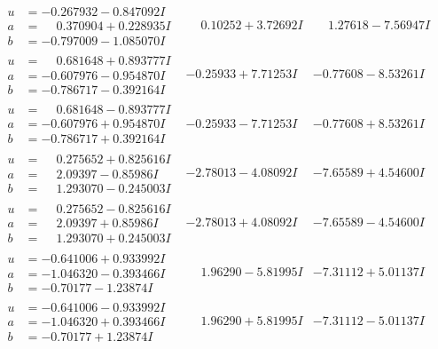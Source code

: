 \documentclass[1p]{elsarticle_modified}
\theoremstyle{definition}
\begin{document}
$$\begin{array}{c|c|c}
\begin{aligned}
u &= -0.267932 - 0.847092 I \\
a &= \phantom{-}0.370904 + 0.228935 I \\
b &= -0.797009 - 1.085070 I\end{aligned}
 & \phantom{-}0.10252 + 3.72692 I & \phantom{-}1.27618 - 7.56947 I \\ \hline\begin{aligned}
u &= \phantom{-}0.681648 + 0.893777 I \\
a &= -0.607976 - 0.954870 I \\
b &= -0.786717 - 0.392164 I\end{aligned}
 & -0.25933 + 7.71253 I & -0.77608 - 8.53261 I \\ \hline\begin{aligned}
u &= \phantom{-}0.681648 - 0.893777 I \\
a &= -0.607976 + 0.954870 I \\
b &= -0.786717 + 0.392164 I\end{aligned}
 & -0.25933 - 7.71253 I & -0.77608 + 8.53261 I \\ \hline\begin{aligned}
u &= \phantom{-}0.275652 + 0.825616 I \\
a &= \phantom{-}2.09397 - 0.85986 I \\
b &= \phantom{-}1.293070 - 0.245003 I\end{aligned}
 & -2.78013 - 4.08092 I & -7.65589 + 4.54600 I \\ \hline\begin{aligned}
u &= \phantom{-}0.275652 - 0.825616 I \\
a &= \phantom{-}2.09397 + 0.85986 I \\
b &= \phantom{-}1.293070 + 0.245003 I\end{aligned}
 & -2.78013 + 4.08092 I & -7.65589 - 4.54600 I \\ \hline\begin{aligned}
u &= -0.641006 + 0.933992 I \\
a &= -1.046320 - 0.393466 I \\
b &= -0.70177 - 1.23874 I\end{aligned}
 & \phantom{-}1.96290 - 5.81995 I & -7.31112 + 5.01137 I \\ \hline\begin{aligned}
u &= -0.641006 - 0.933992 I \\
a &= -1.046320 + 0.393466 I \\
b &= -0.70177 + 1.23874 I\end{aligned}
 & \phantom{-}1.96290 + 5.81995 I & -7.31112 - 5.01137 I \\ \hline\begin{aligned}

\end{aligned}
\end{array}$$
\end{document}
